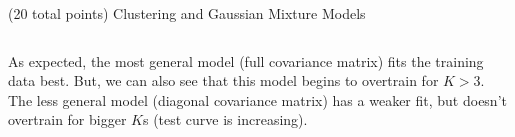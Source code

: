 \documentclass[12pt]{article}
\begin{document}
\begin{question}{(20 total points) Clustering and Gaussian Mixture Models}
\begin{subquestion}
\begin{answerbox}{30em}
\begin{center}
\begin{tabular}{|c|c|c|c|c|c|}
			\end{tabular} 
		\end{center}
	As expected, the most general model (full covariance matrix) fits the training data best. But, we can also see that this model begins to overtrain for $K>3$. The less general model (diagonal covariance matrix) has a weaker fit, but doesn't overtrain for bigger $K$s (test curve is increasing).

      \end{answerbox}
  


   \end{subquestion}

   
\end{question}
\end{document}
